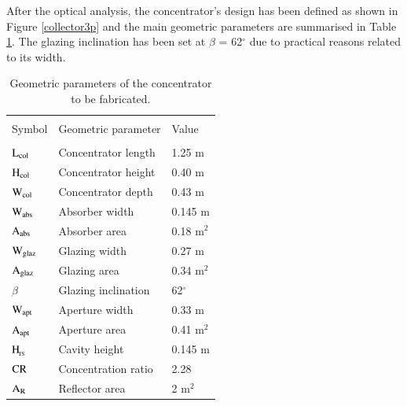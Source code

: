 After the optical analysis, the concentrator's design has been defined as shown in Figure \ref{collector3p} and the main geometric parameters are summarised in Table \ref{optics_parameters}. The glazing inclination has been set at $\beta$ = 62$^{\circ}$ due to practical reasons related to its width. 


\begin{table}[!ht]
	\caption{Geometric parameters of the concentrator to be fabricated.}
	\centering
	\begin{tabular}{p{1.75cm}p{4.5cm}p{2.0cm}}
		\hline \\[-10pt]
		Symbol & Geometric parameter & Value \\ [2pt]
		\hline \\[-12pt]
		$\rm{L_{col}}$ & Concentrator length & 1.25 m \\ [2pt]
		
		$\rm{H_{col}}$ & Concentrator height & 0.40 m \\ [2pt]
		
		$\rm{W_{col}}$ & Concentrator depth & 0.43 m \\ [2pt]
		
		$\rm{W_{abs}}$ & Absorber width & 0.145 m \\ [2pt]
		
		$\rm{A_{abs}}$ & Absorber area & 0.18 m$^2$ \\ [2pt]
		
		$\rm{W_{glaz}}$ & Glazing width & 0.27 m \\ [2pt]
		
		$\rm{A_{glaz}}$ & Glazing area & 0.34 m$^2$ \\ [2pt]
		
		$\beta$ & Glazing inclination & 62$^{\circ}$ \\ [2pt]
		
		$\rm{W_{apt}}$ & Aperture width & 0.33 m \\ [2pt]
		
		$\rm{A_{apt}}$ & Aperture area & 0.41 m$^2$ \\ [2pt]
		
		$\rm{H_{\!_{TS}}}$ & Cavity height & 0.145 m \\ [2pt]
		
		$\rm{CR}$ & Concentration ratio & 2.28 \\ [2pt]
		
		$\rm{A_{R}}$ & Reflector area & 2 m$^2$ \\
		
		\hline 
	\end{tabular}
	\label{optics_parameters}
\end{table}


